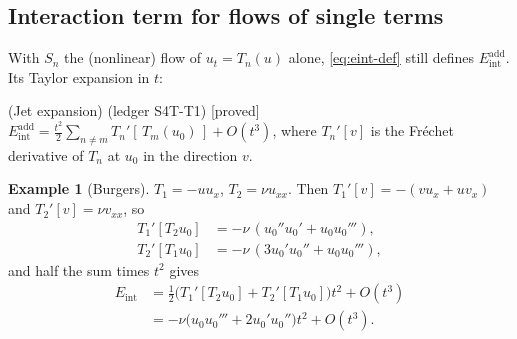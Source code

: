 \documentclass[11pt,a4paper]{article}
\theoremstyle{definition}
\newtheorem{example}{Example}[section]
\newcommand{\badge}[2]{\textcolor{#1}{\textsf{\footnotesize[#2]}}}
\newcommand{\proved}[1][]{\badge{cC}{proved#1}}
\newcommand{\led}[1]{\textcolor{cG}{\textsf{\footnotesize(ledger #1)}}}
\newcommand{\Eint}{E_{\mathrm{int}}}
\begin{document}
\subsection{Interaction term for flows of single terms}
With $S_n$ the (nonlinear) flow of $u_t=T_n(u)$ alone, \eqref{eq:eint-def} still defines $\Eint^{\mathrm{add}}$. Its Taylor expansion in $t$:
\begin{theorem}{(Jet expansion) \led{S4T-T1} \proved[]}\label{thm:jet}
$\displaystyle \Eint^{\mathrm{add}}=\frac{t^2}{2}\sum_{n\ne m}T_n'[\,T_m(u_0)\,]+O(t^3)$, where $T_n'[v]$ is the Fr\'echet derivative of $T_n$ at $u_0$ in the direction $v$.
\end{theorem}
\begin{example}[Burgers]\label{ex:burgers-jet}
$T_1=-uu_x$, $T_2=\nu u_{xx}$. Then $T_1'[v]=-(vu_x+uv_x)$ and $T_2'[v]=\nu v_{xx}$, so
\[
\begin{aligned}
T_1'[T_2u_0]&=-\nu\,(u_0''u_0'+u_0u_0'''),\\
T_2'[T_1u_0]&=-\nu\,(3u_0'u_0''+u_0u_0'''),
\end{aligned}
\]
and half the sum times $t^2$ gives
\[
\begin{aligned}
\Eint&=\tfrac12\big(T_1'[T_2u_0]+T_2'[T_1u_0]\big)t^2+O(t^3)\\
&=-\nu\big(u_0u_0'''+2u_0'u_0''\big)t^2+O(t^3).
\end{aligned}
\]
\end{example}
\end{document}

